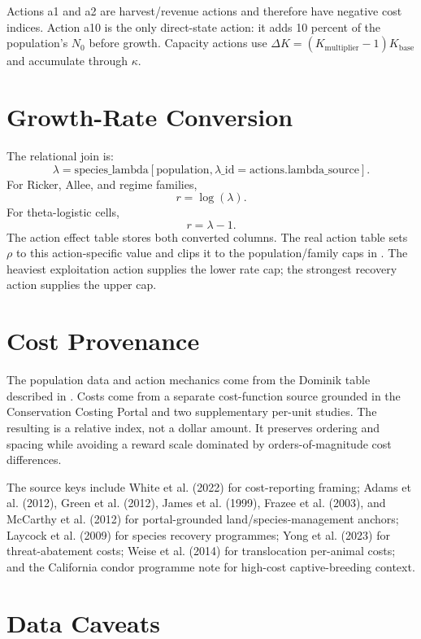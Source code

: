 \documentclass[11pt]{article}
\begin{document}
Actions a1 and a2 are harvest/revenue actions and therefore have negative cost
indices. Action a10 is the only direct-state action: it adds 10 percent of the
population's $N_0$ before growth. Capacity actions use
$\Delta K=(K_{\mathrm{multiplier}}-1)K_{\mathrm{base}}$ and accumulate through
$\kappa$.

\section{Growth-Rate Conversion}

The relational join is:
\[
  \lambda =
  \mathrm{species\_lambda}[\mathrm{population},\lambda\_\mathrm{id}
    =\mathrm{actions.lambda\_source}].
\]
For Ricker, Allee, and regime families,
\[
  r = \log(\lambda).
\]
For theta-logistic cells,
\[
  r = \lambda - 1.
\]
The action effect table stores both converted columns. The real action table
sets $\rho$ to this action-specific value and clips it to the population/family
caps in . The heaviest exploitation action supplies the lower
rate cap; the strongest recovery action supplies the upper cap.

\section{Cost Provenance}

The population data and action mechanics come from the Dominik table described
in . Costs come from a separate cost-function
source grounded in the Conservation Costing Portal and two supplementary
per-unit studies. The resulting  is a relative index, not a
dollar amount. It preserves ordering and spacing while avoiding a reward scale
dominated by orders-of-magnitude cost differences.

The source keys include White et al. (2022) for cost-reporting framing; Adams et
al. (2012), Green et al. (2012), James et al. (1999), Frazee et al. (2003), and
McCarthy et al. (2012) for portal-grounded land/species-management anchors;
Laycock et al. (2009) for species recovery programmes; Yong et al. (2023) for
threat-abatement costs; Weise et al. (2014) for translocation per-animal costs;
and the California condor programme note for high-cost captive-breeding context.

\section{Data Caveats}
\end{document}
